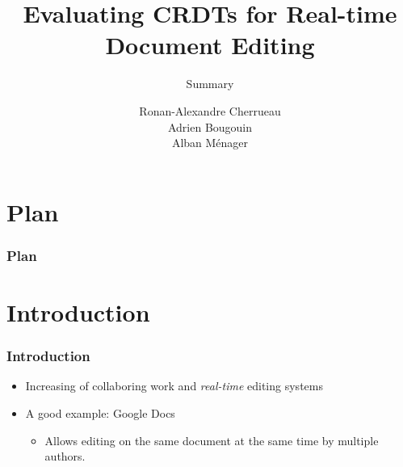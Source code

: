 \documentclass[14pt]{beamer}
\title{\og Evaluating CRDTs for Real-time Document Editing \fg}
\subtitle{Summary}
\author{Ronan-Alexandre Cherrueau\\Adrien Bougouin\\Alban Ménager}
\begin{document}
\begin{frame}
	\titlepage
\end{frame}

\section*{Plan}
\begin{frame}
	\frametitle{Plan}
	\tableofcontents[hideallsubsections]
\end{frame}

\section{Introduction}
	\begin{frame}
		\frametitle{Introduction}
   		\begin{itemize}
    		\item Increasing of collaboring work and \emph{real-time}	 editing systems
    		\item A good example: Google Docs
    		\begin{itemize}
    			\item Allows editing on the same document at the same time by multiple authors.
    		\end{itemize}
    	\end{itemize}
	\end{frame}
\end{document}
